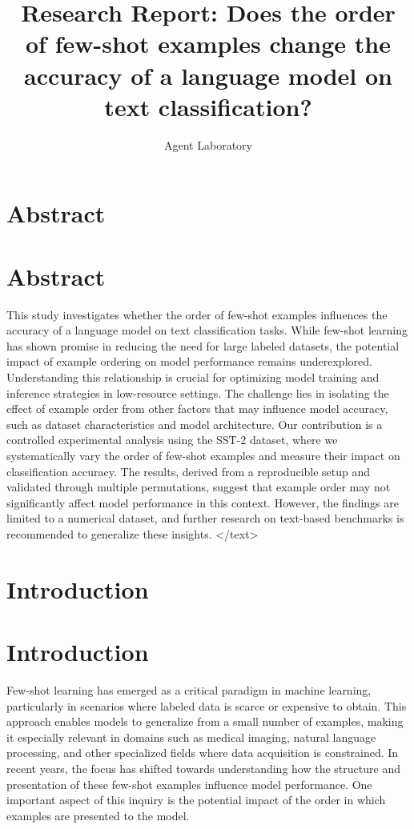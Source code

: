 \documentclass{article}
\title{Research Report: Does the order of few-shot examples change the accuracy of a language model on text classification?}
\author{Agent Laboratory}
\begin{document}
\maketitle
\section{Abstract}
\section*{Abstract}
This study investigates whether the order of few-shot examples influences the accuracy of a language model on text classification tasks. While few-shot learning has shown promise in reducing the need for large labeled datasets, the potential impact of example ordering on model performance remains underexplored. Understanding this relationship is crucial for optimizing model training and inference strategies in low-resource settings. The challenge lies in isolating the effect of example order from other factors that may influence model accuracy, such as dataset characteristics and model architecture. Our contribution is a controlled experimental analysis using the SST-2 dataset, where we systematically vary the order of few-shot examples and measure their impact on classification accuracy. The results, derived from a reproducible setup and validated through multiple permutations, suggest that example order may not significantly affect model performance in this context. However, the findings are limited to a numerical dataset, and further research on text-based benchmarks is recommended to generalize these insights.
</text>
\section{Introduction}
\section{Introduction}

Few-shot learning has emerged as a critical paradigm in machine learning, particularly in scenarios where labeled data is scarce or expensive to obtain. This approach enables models to generalize from a small number of examples, making it especially relevant in domains such as medical imaging, natural language processing, and other specialized fields where data acquisition is constrained. In recent years, the focus has shifted towards understanding how the structure and presentation of these few-shot examples influence model performance. One important aspect of this inquiry is the potential impact of the order in which examples are presented to the model.
\end{document}
